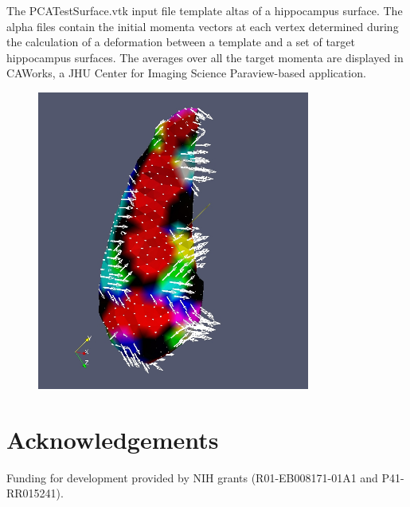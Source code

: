 \documentclass{InsightArticle}
\begin{document}
The PCATestSurface.vtk input file template altas of a hippocampus surface.  The alpha files
contain the initial momenta vectors at each vertex determined during the calculation of a
deformation between a template and a set of target hippocampus surfaces.
The averages over all the target momenta are displayed in CAWorks, a JHU Center for
Imaging Science Paraview-based application.

\begin{figure}
\center
\includegraphics[width=0.8\textwidth]{AveragedMomentumsPREDICT.jpg}
\label{fig:HippocampusMomentaAverages}
\end{figure}

\section{Acknowledgements}

Funding for development provided by NIH grants (R01-EB008171-01A1 
and P41-RR015241).

%
%



\end{document}
